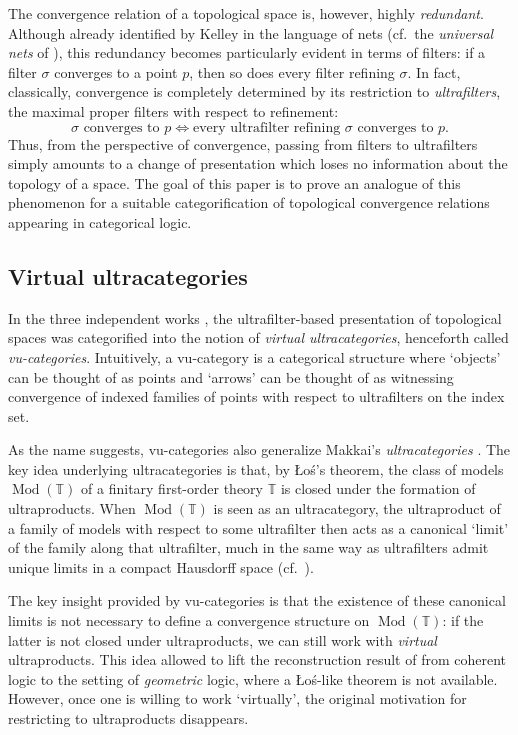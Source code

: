 The convergence relation of a topological space is, however, highly \emph{redundant}. Although already identified by Kelley in the language of nets (cf.\ the \emph{universal nets} of \cite{kelleyConvergenceTopology1950}), this redundancy becomes particularly evident in terms of filters: if a filter $\sigma$ converges to a point $p$, then so does every filter refining $\sigma$. In fact, classically, convergence is completely determined by its restriction to \emph{ultrafilters}, the maximal proper filters with respect to refinement:
\[ \sigma \mbox{ converges to }p \iff \mbox{every ultrafilter refining } \sigma \mbox{ converges to }p .\]
Thus, from the perspective of convergence, passing from filters to ultrafilters simply amounts to a change of presentation which loses no information about the topology of a space. The goal of this paper is to prove an analogue of this phenomenon for a suitable categorification of topological convergence relations appearing in categorical logic. 

\subsection*{Virtual ultracategories} In the three independent works \cite{saadiaExtendingConceptualCompleteness2026,hamadGeneralisedUltracategoriesConceptual2025,vangoolToposesEnoughPoints2026}, the ultrafilter-based presentation of topological spaces was categorified into the notion of \emph{virtual ultracategories}, henceforth called \emph{vu-categories}. Intuitively, a vu-category is a categorical structure where `objects' can be thought of as points and `arrows' can be thought of as witnessing convergence of indexed families of points with respect to ultrafilters on the index set. 


As the name suggests, vu-categories also generalize Makkai's \emph{ultracategories} \cite{makkaiStoneDualityFirst1987}. The key idea underlying ultracategories is that, by \L o\'s's theorem, the class of models $\operatorname{Mod}(\mathbb T)$ of a finitary first-order theory $\mathbb T$ is closed under the formation of ultraproducts. When $\operatorname{Mod}(\mathbb T)$ is seen as an ultracategory, the ultraproduct of a family of models with respect to some ultrafilter then acts as a canonical `limit' of the family along that ultrafilter, much in the same way as ultrafilters admit unique limits in a compact Hausdorff space (cf.\ \cite{manesTripleTheoreticConstruction1969}). 

The key insight provided by vu-categories is that the existence of these canonical limits is not necessary to define a convergence structure on $\operatorname{Mod}(\mathbb T)$: if the latter is not closed under ultraproducts, we can still work with \emph{virtual} ultraproducts. This idea allowed \cite{saadiaExtendingConceptualCompleteness2026,hamadGeneralisedUltracategoriesConceptual2025,vangoolToposesEnoughPoints2026} to lift the reconstruction result of \cite{makkaiStoneDualityFirst1987,lurieUltracategories2018} from coherent logic to the setting of \emph{geometric} logic, where a \L o\'s-like theorem is not available.
However, once one is willing to work `virtually', the original motivation for restricting to ultraproducts disappears. 

